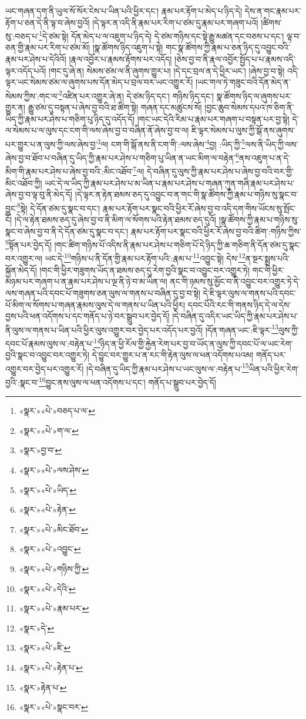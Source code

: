 ཡང་གཞན་དག་ནི་ཡུལ་སོ་སོར་ངེས་པ་ཡིན་པའི་ཕྱིར་དང་། རྣམ་པར་རྟོག་པ་མེད་པ་ཉིད་དེ། དེས་ན་གང་རྣམ་པར་རྟོག་པ་ཅན་དེ་ནི་ལྟ་བ་ཞེས་བྱའོ། །དེ་ལྟར་ན་འདི་ནི་རྣམ་པར་རིག་པ་ཙམ་དུ་རྣམ་པར་གཞག་པའོ། །ཚིགས་སུ་:བཅད་པ་\footnote{«སྣར་»«པེ་»བཅད་པ་ལ་}དེ་ཙམ་སྟེ། དོན་མེད་པ་ལ་འཇུག་པ་ཉིད་དེ། དེ་ཙམ་གཉིས་དང་སྟེ་རྒྱུ་མཚན་དང་བཅས་པ་དང་། ལྟ་བ་ཅན་གྱི་རྣམ་པར་རིག་པ་ཙམ་མོ། །སྣ་ཚོགས་ཉིད་འཇུག་པ་སྟེ། གང་སྣ་ཚོགས་ཀྱི་རྣམ་པ་ཅན་ཉིད་དུ་འབྱུང་བའི་རྣམ་པར་ཤེས་པ་དེའིའོ། །རྣལ་འབྱོར་པ་རྣམས་རྟོགས་པར་འདོད། །ཅེས་བྱ་བ་ནི་རྣལ་འབྱོར་སྤྱོད་པ་པ་རྣམས་འདི་ལྟར་འདོད་པའོ། །གང་དུ་ཞེ་ན། སེམས་ཙམ་ལ་ནི་ཞུགས་གྱུར་པ། །དེ་དང་བྲལ་ན་དེ་ཕྱིར་ཡང་། །ཞེས་བྱ་བ་སྟེ། འདི་ལྟར་ཡང་སེམས་ཙམ་ལ་ཞུགས་པས་དོན་མེད་པ་བྲལ་བར་ཡང་འགྱུར་རོ། །ཡང་གལ་ཏེ་གཟུང་བའི་དོན་མེད་ན་སེམས་ཀྱིས་:གང་ལ་\footnote{«སྣར་»«པེ་»ག་ལ་}འཛིན་པར་འགྱུར་ཞེ་ན། དེ་ཙམ་ཉིད་དང་། གཉིས་ཉིད་དང་། སྣ་ཚོགས་ཉིད་ལ་ཞུགས་པར་གྱུར་ན། རྒྱུ་ཙམ་དུ་བསྟན་པ་ཞེས་བྱ་བའི་ཐ་ཚིག་སྟེ། གཞན་དང་མཚུངས་སོ། །བྱང་ཆུབ་སེམས་དཔའ་ཁ་ཅིག་ནི་ཡིད་ཀྱི་རྣམ་པར་ཤེས་པ་གཅིག་པུ་ཉིད་དུ་འདོད་དོ། །གང་ཡང་དེའི་རིམ་པ་རྣམ་པར་གཞག་པ་བསྟན་པར་བྱ་སྟེ། དེ་ལ་སེམས་པ་ལ་ལུས་དང་ངག་གི་ལས་ཞེས་བྱ་བ་བཞིན་ནོ་ཞེས་བྱ་བ་ལ། ཇི་ལྟར་སེམས་པ་ལུས་ཀྱི་སྒོ་ནས་ཞུགས་པར་གྱུར་པ་ན་ལུས་ཀྱི་ལས་ཞེས་བྱ་\footnote{«སྣར་»བྱ་བ་}ལ། ངག་གི་སྒོ་ནས་ནི་ངག་གི་:ལས་ཞེས་\footnote{«སྣར་»«པེ་»ལས་ཤེས་}བྱ། :ཡིད་ཀྱི་\footnote{«སྣར་»«པེ་»ཡིད་}ལས་ནི་ཡིད་ཀྱི་ལས་ཞེས་བྱ་བ་ཐོབ་པ་བཞིན་དུ་ཡིད་ཀྱི་རྣམ་པར་ཤེས་པ་གཅིག་པུ་ཡིན་ན་ཡང་མིག་ལ་བརྟེན་\footnote{«སྣར་»«པེ་»རྟེན་}ནས་འཇུག་པ་ན་དེ་མིག་གི་རྣམ་པར་ཤེས་པ་ཞེས་བྱ་བའི་:མིང་འཐོབ་\footnote{«སྣར་»«པེ་»མིང་ཐོབ་}ལ། དེ་བཞིན་དུ་ལུས་ཀྱི་རྣམ་པར་ཤེས་པ་ཞེས་བྱ་བའི་བར་གྱི་མིང་འཐོབ་ཀྱི། ཡང་དེ་ལ་ཡིད་ཀྱི་རྣམ་པར་ཤེས་པ་མ་ཡིན་པ་རྣམ་པར་ཤེས་པ་གཞན་ཀུན་གཞི་རྣམ་པར་ཤེས་པ་ཞེས་བྱ་བ་ལྟ་བུ་ནི་མེད་དོ། །དེ་ལྟར་ན་རྟེན་ཐམས་ཅད་དུ་འབྱུང་བ་ན་གང་གི་སྣ་ཚོགས་ཀྱི་རྣམ་པ་གཉིས་སུ་སྣང་བ་བྱུང་\footnote{«སྣར་»«པེ་»འབྱུང་}སྟེ། དེ་དོན་ཙམ་དུ་སྣང་བ་དང་། རྣམ་པར་རྟོག་པར་སྣང་བའི་ཕྱིར་རོ་ཞེས་བྱ་བ་འདི་དག་གིས་ཡོངས་སུ་སྤོང་ངོ། །དེ་ལ་རྟེན་ཐམས་ཅད་དུ་ཞེས་བྱ་བ་ནི་མིག་ལ་སོགས་པའི་རྟེན་ཐམས་ཅད་དུའོ། །སྣ་ཚོགས་ཀྱི་རྣམ་པ་གཉིས་སུ་སྣང་བ་ཞེས་བྱ་བ་ནི་དེ་དོན་ཙམ་དུ་སྣང་བ་དང་། རྣམ་པར་རྟོག་པར་སྣང་བའི་ཕྱིར་རོ་ཞེས་བྱ་བའི་ཚིག་:གཉིས་ཀྱིས་\footnote{«སྣར་»«པེ་»གཉིས་ཀྱི་}སྟོན་པར་བྱེད་དོ། །གང་ཚིག་གཉིས་པོ་འདིས་ནི་རྣམ་པར་ཤེས་པ་གཅིག་པོ་དེ་ཉིད་ཀྱི་ཆ་གཅིག་ནི་དོན་ཙམ་དུ་སྣང་བར་འགྱུར་ལ། ཡང་དེ་\footnote{«སྣར་»«པེ་»དེའི་}གཉིས་པ་ནི་དོན་གྱི་རྣམ་པར་རྟོག་པའི་:རྣམ་པ་\footnote{«སྣར་»«པེ་»རྣམ་པར་}འབྱུང་སྟེ། དེས་\footnote{«སྣར་»དེ་}ན་སྔར་སྨྲས་པའི་སྐྱོན་མེད་དོ། །གང་གི་ཕྱིར་གཟུགས་ཡོད་ན་ཐམས་ཅད་དུ་རེག་བྱའི་སྣང་བ་འབྱུང་བར་འགྱུར་ཏེ། གང་གི་ཕྱིར་མཉམ་པར་གཞག་པ་ན་རྣམ་པར་ཤེས་པ་ལྔ་ནི་ཉེ་བ་མ་ཡིན་ལ། ནང་གི་ཉམས་སུ་མྱོང་བ་ནི་འབྱུང་བར་འགྱུར་ཏེ་དེ་ལས་གཞན་པའི་དབང་པོ་གཟུགས་ཅན་ལུས་ལ་གནས་པ་བཞིན་དུ་བྱ་བ་སྟེ། དེ་ཇི་ལྟར་ལུས་ལ་གནས་པའི་དབང་པོ་མིག་ལ་སོགས་པ་གཞན་རྣམས་ལུས་དེ་ལ་གནས་པ་ཡིན་པའི་ཕྱིར། དབང་པོའི་རང་གི་གནས་ཉིད་དེ་ལ་དེས་བྱས་པའི་ཕན་འདོགས་པ་དང་གནོད་པ་ཉེ་བར་སྒྲུབ་པར་བྱེད་དོ། །དེ་བཞིན་དུ་འདིར་ཡང་ཡིད་ཀྱི་རྣམ་པར་ཤེས་པ་ནི་ལུས་ལ་གནས་པ་ཡིན་པའི་ཕྱིར་ལུས་འགྱུར་བར་བྱེད་པར་འདོད་པར་བྱའོ། །དོན་གཞན་ཡང་:ཇི་ལྟར་\footnote{«སྣར་»«པེ་»ཇི་}ལུས་ཀྱི་དབང་པོ་རྣམས་ལུས་ལ་:བརྟེན་པ་\footnote{«སྣར་»«པེ་»རྟེན་པ་}ཉིད་ན་ཕྱི་རོལ་གྱི་རྐྱེན་རེག་པར་བྱ་བ་ཡོད་ན་ལུས་ཀྱི་དབང་པོ་ལ་ཡང་རེག་བྱའི་སྣང་བ་འབྱུང་བར་འགྱུར་ཏེ། དེ་བྱུང་བར་གྱུར་པ་ན་རང་གི་རྟེན་ལུས་ལ་ཕན་འདོགས་པའམ། གནོད་པར་འགྱུར་བར་བྱེད་པར་འགྱུར་རོ། །དེ་བཞིན་དུ་ཡིད་ཀྱི་རྣམ་པར་ཤེས་པ་ཡང་ལུས་ལ་:བརྟེན་པ་\footnote{«སྣར་»རྟེན་པ་}ཡིན་པའི་ཕྱིར་རེག་བྱའི་:སྣང་བ་\footnote{«སྣར་»«པེ་»སྣང་བར་}བྱུང་ནས་ལུས་ལ་ཕན་འདོགས་པ་དང་། གནོད་པ་སྒྲུབ་པར་བྱེད་དོ། 
